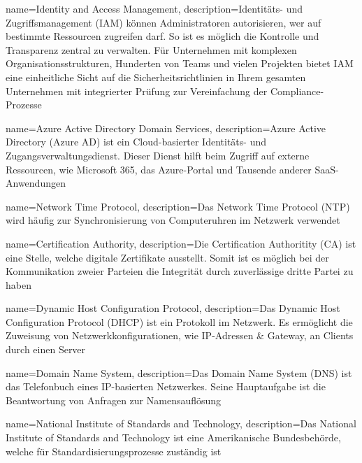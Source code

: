 


{
    name=Identity and Access Management,
    description={Identitäts- und Zugriffsmanagement (IAM) können Administratoren autorisieren, wer auf bestimmte Ressourcen zugreifen darf.
            So ist es möglich die Kontrolle und Transparenz zentral zu verwalten.
            Für Unternehmen mit komplexen Organisationsstrukturen, Hunderten von Teams und vielen Projekten bietet IAM eine einheitliche Sicht auf die Sicherheitsrichtlinien in Ihrem gesamten Unternehmen mit integrierter Prüfung zur Vereinfachung der Compliance-Prozesse}
}

{
    name=Azure Active Directory Domain Services,
    description={Azure Active Directory (Azure AD) ist ein Cloud-basierter Identitäts- und Zugangsverwaltungsdienst.
            Dieser Dienst hilft beim Zugriff auf externe Ressourcen, wie Microsoft 365, das Azure-Portal und Tausende anderer SaaS-Anwendungen}
}

{
    name=Network Time Protocol,
    description={Das Network Time Protocol (NTP) wird häufig zur Synchronisierung von Computeruhren im Netzwerk verwendet}
}

{
    name=Certification Authority,
    description={Die Certification Authoritity (CA) ist eine Stelle, welche digitale Zertifikate ausstellt. Somit ist es möglich bei der Kommunikation zweier Parteien die Integrität durch zuverlässige dritte Partei zu haben}
}

{
    name=Dynamic Host Configuration Protocol,
    description={Das Dynamic Host Configuration Protocol (DHCP) ist ein Protokoll im Netzwerk. Es ermöglicht die Zuweisung von Netzwerkkonfigurationen, wie IP-Adressen \& Gateway, an Clients durch einen Server}
}

{
    name=Domain Name System,
    description={Das Domain Name System (DNS) ist das Telefonbuch eines IP-basierten Netzwerkes. Seine Hauptaufgabe ist die Beantwortung von Anfragen zur Namensauflösung}
}

{
    name=National Institute of Standards and Technology,
    description={Das National Institute of Standards and Technology ist eine Amerikanische Bundesbehörde, welche für Standardisierungsprozesse zuständig ist}
}

